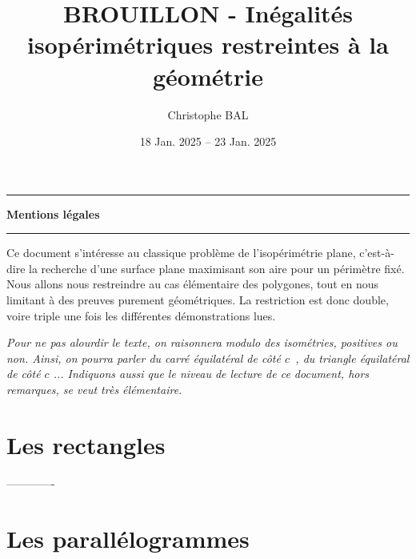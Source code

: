 \documentclass[12pt]{amsart}
\begin{document}
\title{BROUILLON - Inégalités isopérimétriques restreintes à la géométrie}
\author{Christophe BAL}
\date{18 Jan. 2025 -- 23 Jan. 2025}
\maketitle


\begin{center}
	\hrule\vspace{.3em}
	{
		\fontsize{1.35em}{1em}\selectfont
		\textbf{Mentions \og légales \fg}
	}
			
	\vspace{0.45em}
	\doclicenseThis
	\hrule
\end{center}



\setcounter{tocdepth}{2}
\tableofcontents




\newpage

Ce document s'intéresse au classique problème de l'isopérimétrie plane, c'est-à-dire la recherche d'une surface plane maximisant son aire pour un périmètre fixé.
Nous allons nous restreindre au cas élémentaire des polygones, tout en nous limitant à des preuves purement géométriques. La restriction est donc double, voire triple une fois les différentes démonstrations lues.


\begin{tcolorbox}
	\itshape\small
	Pour ne pas alourdir le texte, on raisonnera modulo des isométries, positives ou non. Ainsi, on pourra parler \og \emph{du carré équilatéral de côté $c$} \fg\,, \og \emph{du triangle équilatéral de côté $c$} \fg...
	Indiquons aussi que le niveau de lecture de ce document, hors remarques, se veut très élémentaire.
\end{tcolorbox}




\section{Les rectangles}




 ------------- %


\section{Les parallélogrammes}


\end{document}
